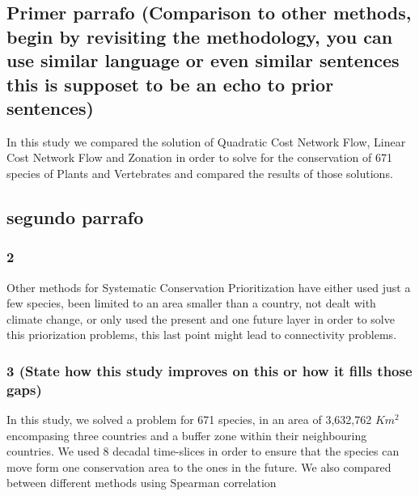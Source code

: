 \documentclass[]{article}
\begin{document}
\hypertarget{primer-parrafo-comparison-to-other-methods-begin-by-revisiting-the-methodology-you-can-use-similar-language-or-even-similar-sentences-this-is-supposet-to-be-an-echo-to-prior-sentences}{%
\subsection{Primer parrafo (Comparison to other methods, begin by revisiting the methodology, you can use similar language or even similar sentences this is supposet to be an echo to prior sentences)}\label{primer-parrafo-comparison-to-other-methods-begin-by-revisiting-the-methodology-you-can-use-similar-language-or-even-similar-sentences-this-is-supposet-to-be-an-echo-to-prior-sentences}}

In this study we compared the solution of Quadratic Cost Network Flow, Linear Cost Network Flow and Zonation in order to solve for the conservation of 671 species of Plants and Vertebrates and compared the results of those solutions.

\hypertarget{segundo-parrafo}{%
\subsection{segundo parrafo}\label{segundo-parrafo}}

\hypertarget{section}{%
\subsubsection{2}\label{section}}

Other methods for Systematic Conservation Prioritization have either used just a few species, been limited to an area smaller than a country, not dealt with climate change, or only used the present and one future layer in order to solve this priorization problems, this last point might lead to connectivity problems.

\hypertarget{state-how-this-study-improves-on-this-or-how-it-fills-those-gaps}{%
\subsubsection{3 (State how this study improves on this or how it fills those gaps)}\label{state-how-this-study-improves-on-this-or-how-it-fills-those-gaps}}

In this study, we solved a problem for 671 species, in an area of 3,632,762 \(Km^2\) encompasing three countries and a buffer zone within their neighbouring countries. We used 8 decadal time-slices in order to ensure that the species can move form one conservation area to the ones in the future. We also compared between different methods using Spearman correlation
\end{document}
